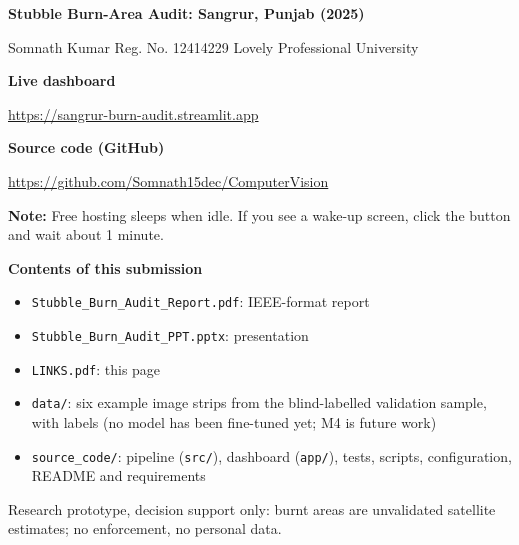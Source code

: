 \documentclass[11pt]{article}
\begin{document}
{\LARGE\bfseries Stubble Burn-Area Audit: Sangrur, Punjab (2025)}\par
\vspace{0.5em}
Somnath Kumar \quad Reg. No. 12414229 \quad Lovely Professional University\par
\vspace{1.5em}
{\large\bfseries Live dashboard}\par
\url{https://sangrur-burn-audit.streamlit.app}\par
\vspace{1em}
{\large\bfseries Source code (GitHub)}\par
\url{https://github.com/Somnath15dec/ComputerVision}\par
\vspace{1.5em}
\textbf{Note:} Free hosting sleeps when idle. If you see a wake-up screen, click the button and
wait about 1 minute.\par
\vspace{1.5em}
\textbf{Contents of this submission}
\begin{itemize}
\item \texttt{Stubble\_Burn\_Audit\_Report.pdf}: IEEE-format report
\item \texttt{Stubble\_Burn\_Audit\_PPT.pptx}: presentation
\item \texttt{LINKS.pdf}: this page
\item \texttt{data/}: six example image strips from the blind-labelled validation sample, with
labels (no model has been fine-tuned yet; M4 is future work)
\item \texttt{source\_code/}: pipeline (\texttt{src/}), dashboard (\texttt{app/}), tests,
scripts, configuration, README and requirements
\end{itemize}
\vspace{1em}
\small Research prototype, decision support only: burnt areas are unvalidated satellite
estimates; no enforcement, no personal data.
\end{document}
